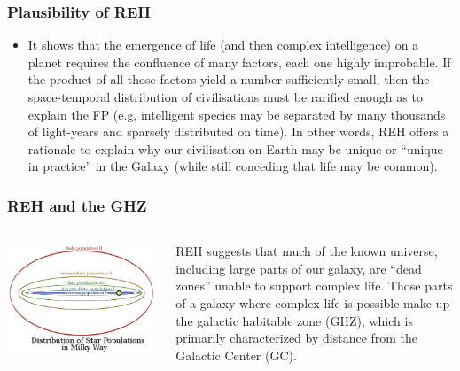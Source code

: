 \begin{frame}
\frametitle{Plausibility of REH}
\begin{itemize}
\item It shows that the emergence of life (and then complex intelligence) on a planet requires the confluence of many factors, each one highly improbable. If the product of all those factors yield a number sufficiently small, then the space-temporal distribution of civilisations must be rarified enough as to explain the FP (e.g, intelligent species may be separated by many thousands of light-years and sparsely distributed on time). In other words, REH offers a rationale to explain why our civilisation on Earth may be unique or ``unique in practice'' in the Galaxy (while still conceding that life may be common). 
\end{itemize}
\end{frame}

\begin{frame}
\frametitle{REH and the GHZ}
\begin{columns}

\includegraphics[scale=0.20]{ghz.png}

 
 REH suggests that much of the known universe, including large parts of our galaxy, are ``dead zones'' unable to support complex life. Those parts of a galaxy where complex life is possible make up the galactic habitable zone (GHZ), which is primarily characterized by distance from the Galactic Center (GC).
\end{columns}
\end{frame}

